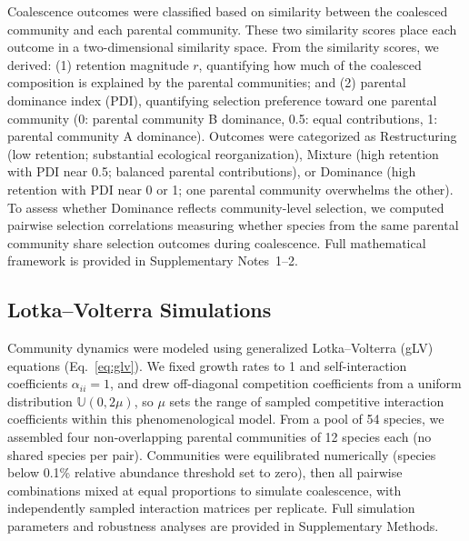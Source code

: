 Coalescence outcomes were classified based on similarity between the coalesced community and each parental community.  These two similarity scores place each outcome in a two-dimensional similarity space. From the similarity scores, we derived: (1) retention magnitude $r$, quantifying how much of the coalesced composition is explained by the parental communities; and (2) parental dominance index (PDI), quantifying selection preference toward one parental community (0: parental community B dominance, 0.5: equal contributions, 1: parental community A dominance).  Outcomes were categorized as Restructuring (low retention; substantial ecological reorganization), Mixture (high retention with PDI near 0.5; balanced parental contributions), or Dominance (high retention with PDI near 0 or 1; one parental community overwhelms the other). To assess whether Dominance reflects community-level selection, we computed pairwise selection correlations measuring whether species from the same parental community share selection outcomes during coalescence. Full mathematical framework is provided in Supplementary Notes~1--2.


\subsection*{Lotka--Volterra Simulations}
\label{sec:methods:simulations}

Community dynamics were modeled using generalized Lotka--Volterra (gLV) equations (Eq.~\ref{eq:glv}). We fixed growth rates to 1 and self-interaction coefficients $\alpha_{ii} = 1$, and drew off-diagonal competition coefficients from a uniform distribution $\mathbb{U}(0, 2\mu)$, so $\mu$ sets the range of sampled competitive interaction coefficients within this phenomenological model. From a pool of 54 species, we assembled four non-overlapping parental communities of 12 species each (no shared species per pair). Communities were equilibrated numerically (species below 0.1\% relative abundance threshold set to zero), then all pairwise combinations mixed at equal proportions to simulate coalescence, with independently sampled interaction matrices per replicate. Full simulation parameters and robustness analyses are provided in Supplementary Methods.


